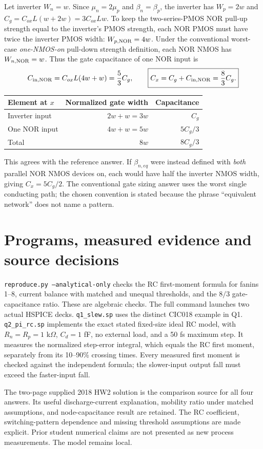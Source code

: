 \documentclass[11pt,a4paper]{article}
\begin{document}
Let inverter $W_n=w$. Since $\mu_n=2\mu_p$ and $\beta_n=\beta_p$,
the inverter has $W_p=2w$ and
$C_g=C_{ox}L(w+2w)=3C_{ox}Lw$.
To keep the two-series-PMOS NOR pull-up strength equal to the inverter's
PMOS strength, each NOR PMOS must have twice the inverter PMOS width:
$W_{p,\rm NOR}=4w$. Under the conventional worst-case \emph{one-NMOS-on}
pull-down strength definition, each NOR NMOS has $W_{n,\rm NOR}=w$.
Thus the gate capacitance of one NOR input is
\[
 C_{\rm in,NOR}=C_{ox}L(4w+w)=\frac53C_g,
 \qquad \boxed{C_x=C_g+C_{\rm in,NOR}=\frac83C_g.}
\]
\begin{center}\begin{tabular}{lrr}
\toprule Element at $x$&Normalized gate width&Capacitance\\\midrule
Inverter input&$2w+w=3w$&$C_g$\\
One NOR input&$4w+w=5w$&$5C_g/3$\\
Total&$8w$&$8C_g/3$\\\bottomrule
\end{tabular}\end{center}
This agrees with the reference answer. If $\beta_{n,eq}$ were instead
defined with \emph{both} parallel NOR NMOS devices on, each would have
half the inverter NMOS width, giving $C_x=5C_g/2$. The conventional gate
sizing answer uses the worst single conducting path; the chosen convention
is stated because the phrase ``equivalent network'' does not name a pattern.

\section*{Programs, measured evidence and source decisions}
\texttt{reproduce.py --analytical-only} checks the RC first-moment formula
for fanins 1--8, current balance with matched and unequal thresholds, and
the $8/3$ gate-capacitance ratio. These are algebraic checks.
The full command launches two actual HSPICE decks. \texttt{q1\_slew.sp}
uses the distinct CIC018 example in Q1. \texttt{q2\_pi\_rc.sp} implements
the exact stated fixed-size ideal RC model, with $R_n=R_p=1$ k$\Omega$,
$C_d=1$ fF, no external load, and a 50 fs maximum step.
It measures the normalized step-error integral, which equals the RC
first moment, separately from its 10--90\% crossing times.
Every measured first moment is checked against the independent formula;
the slower-input output fall must exceed the faster-input fall.

The two-page supplied 2018 HW2 solution is the comparison source for all
four answers. Its useful discharge-current explanation, mobility ratio
under matched assumptions, and node-capacitance result are retained.
The RC coefficient, switching-pattern dependence and missing threshold
assumptions are made explicit. Prior student numerical claims are not
presented as new process measurements. The model remains local.
\end{document}
